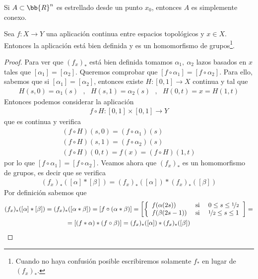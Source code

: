 \begin{ejemplo}
    Si $A\subset \bb{R}^n$ es estrellado desde un punto $x_0$, entonces $A$ es simplemente conexo.
\end{ejemplo}

\begin{lema}
    Sea $f:X\to Y$ una aplicación continua entre espacios topológicos y $x\in X$. Entonces la aplicación
    está bien definida y es un homomorfismo de grupos\footnote{Cuando no haya confusión posible escribiremos solamente $f_*$ en lugar de $(f_x)_*$.}.

    \begin{proof}
        Para ver que $(f_x)_*$ está bien definida tomamos $\alpha_1,\ \alpha_2$ lazos basados en $x$ tales que $[\alpha_1] = [\alpha_2]$. Queremos comprobar que $[f\circ \alpha_1] = [f\circ \alpha_2]$. Para ello, sabemos que si $[\alpha_1] = [\alpha_2]$, entonces existe $H:[0,1]\to X$ continua y tal que
        \begin{gather*}
            H(s,0) =\alpha_1(s)\ \ \  ,\ \ \ H(s,1) = \alpha_2(s)\ \ \ , \ \ \ H(0,t)=x=H(1,t)
        \end{gather*}
        Entonces podemos considerar la aplicación 
        \begin{align*}
            f\circ H : [0,1]\times [0,1] \to Y
        \end{align*}
        que es continua y verifica 
        \begin{gather*}
            (f\circ H) (s,0) = (f \circ \alpha_1)(s)\\
            (f\circ H) (s,1) = (f\circ \alpha_2)(s)\\
            (f\circ H) (0,t) = f(x) = (f\circ H) (1,t)
        \end{gather*}
        por lo que $[f\circ \alpha_1] = [f\circ \alpha_2]$. Veamos ahora que $(f_x)_*$ es un homomorfismo de grupos, es decir que se verifica
        \begin{gather*}
            (f_x)_* ([\alpha] \ast [\beta] ) = (f_x)_* ([\alpha]) \ast (f_x)_* ([\beta])
        \end{gather*}
        Por definición sabemos que 
        \begin{gather*}
            (f_x)_* ([\alpha] \ast [\beta] ) = (f_x)_*([\alpha \ast \beta]) = [f\circ(\alpha \ast \beta)] = \left[\left\{
                \begin{array}{l c c}
                    f(\alpha(2s)) & \text{ si } & 0\leq s \leq \nicefrac{1}{2}\\
                    f(\beta(2s-1)) & \text{ si } & \nicefrac{1}{2} \leq s \leq 1\\
                \end{array}
            \right.\right]=\\
            =[(f\ast \alpha) \ast (f\circ \beta)] = (f_x)_* ([\alpha]) \ast (f_x)_* ([\beta])
        \end{gather*}
    \end{proof}
\end{lema}

